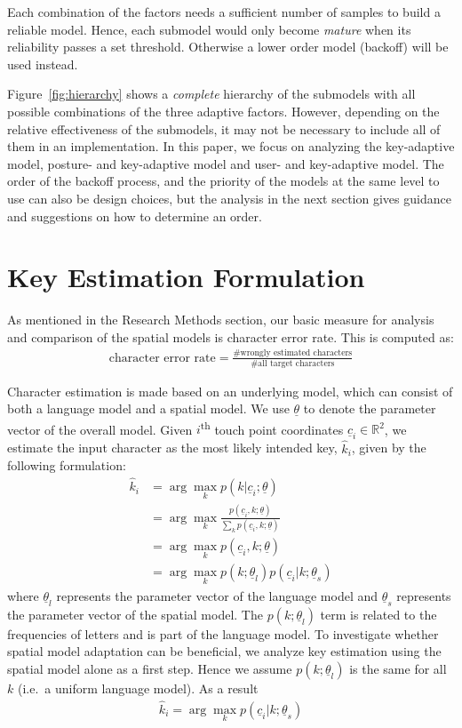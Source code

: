 \documentclass{sigchi}
\begin{document}
Each combination of the factors needs a sufficient number of samples to build a 
reliable model. Hence, each submodel would only become \textit{mature} when its reliability passes a set threshold. Otherwise a lower order model (backoff) will be used instead.

Figure~\ref{fig:hierarchy} shows a \textit{complete} hierarchy of the submodels with all
possible combinations of the three adaptive factors. However, depending on the
relative effectiveness of the submodels, it may not be necessary to include all of
them in an implementation. In this paper, we focus on analyzing the key-adaptive model, posture- and key-adaptive model and user- and key-adaptive model.
The order of the backoff process, and the priority of the models at the same level to use can
also be design choices, but the analysis in the next section gives
guidance and suggestions on how to determine an order.

\section{Key Estimation Formulation}\label{sec:formulation}
As mentioned in the Research Methods section, our basic measure for analysis and comparison of the spatial models is character error rate. This is computed as:
\begin{align}
\text{character error rate} = \frac{\text{\# wrongly estimated
characters}}{\text{\# all target characters}}
\end{align}

Character estimation is made based on an underlying model, which can consist of
both a language model and a spatial model.
We use $\underline\theta$ to denote the parameter vector of the overall model. Given
$i$\textsuperscript{th} touch point coordinates $\underline c_i \in \mathbb{R}^2$, we estimate the input character as the most likely intended key, $\hat k_i$,  given by the following formulation:
\begin{align}
\hat k_i &= \arg\max_k p(k | \underline c_i; \underline \theta) \\
          &= \arg\max_k \frac{p(\underline c_i, k; \underline \theta)}{\sum_k p(\underline c_i, k; \underline \theta)} \\
          &= \arg\max_k p(\underline c_i, k; \underline \theta) \\
          &= \arg\max_k p(k;\underline\theta_l)p(\underline c_i | k; \underline \theta_s) \label{eq:likely-k}
\end{align}
where $\underline\theta_l$ represents the parameter vector of the language model and $\underline\theta_s$ represents the parameter vector of the spatial model. The $p(k;\underline\theta_l)$ term is related to the frequencies of letters and is part of the language model. To investigate whether spatial model adaptation can be beneficial, we analyze key estimation using the spatial model alone as a first step. Hence we assume $p(k; \underline\theta_l)$ is the same for all $k$ (i.e.\ a uniform language model). As a result
\begin{align}
\hat k_i = \arg\max_k p(\underline c_i | k; \underline \theta_s)
\end{align}
\end{document}
